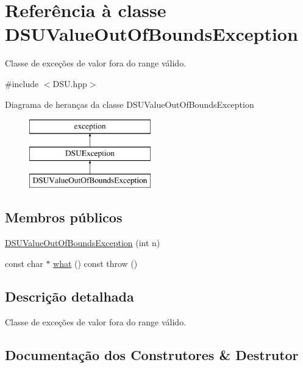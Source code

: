 \hypertarget{classDSUValueOutOfBoundsException}{}\section{Referência à classe D\+S\+U\+Value\+Out\+Of\+Bounds\+Exception}
\label{classDSUValueOutOfBoundsException}


Classe de exceções de valor fora do range válido.  




{\ttfamily \#include $<$D\+S\+U.\+hpp$>$}

Diagrama de heranças da classe D\+S\+U\+Value\+Out\+Of\+Bounds\+Exception\begin{figure}[H]
\begin{center}
\leavevmode
\includegraphics[height=3.000000cm]{classDSUValueOutOfBoundsException}
\end{center}
\end{figure}
\subsection*{Membros públicos}
\begin{DoxyCompactItemize}
\item 
\mbox{\hyperlink{classDSUValueOutOfBoundsException_ace15ec35fac30116b21fe713f59f2943}{D\+S\+U\+Value\+Out\+Of\+Bounds\+Exception}} (int n)
\item 
const char $\ast$ \mbox{\hyperlink{classDSUValueOutOfBoundsException_a20697d2be588c4f19046c9f468675bde}{what}} () const  throw ()
\end{DoxyCompactItemize}


\subsection{Descrição detalhada}
Classe de exceções de valor fora do range válido. 

\subsection{Documentação dos Construtores \& Destrutor}
\mbox{\label{classDSUValueOutOfBoundsException_ace15ec35fac30116b21fe713f59f2943}} 
